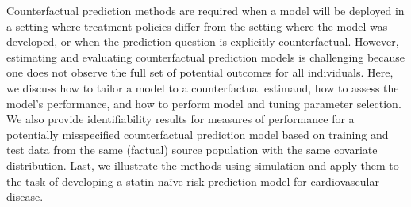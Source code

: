 


Counterfactual prediction methods are required when a model will be deployed in a setting where treatment policies differ from the setting where the model was developed, or when the prediction question is explicitly counterfactual. However, estimating and evaluating counterfactual prediction models is challenging because one does not observe the full set of potential outcomes for all individuals. Here, we discuss how to tailor a model to a counterfactual estimand, how to assess the model's performance, and how to perform model and tuning parameter selection. We also provide identifiability results for measures of performance for a potentially misspecified counterfactual prediction model based on training and test data from the same (factual) source population with the same covariate distribution. Last, we illustrate the methods using simulation and apply them to the task of developing a statin-na\"{i}ve risk prediction model for cardiovascular disease. \\
